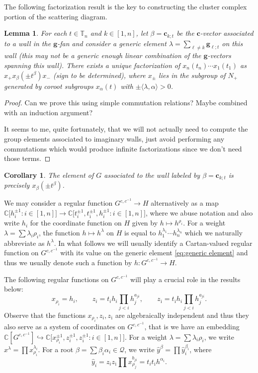 \documentclass{amsart}
\newtheorem{corollary}[theorem]{Corollary}
\newtheorem{lemma}[theorem]{Lemma}
\numberwithin{theorem}{section}
\newcommand{\bfc}{\mathbf{c}}
\newcommand{\bfg}{\mathbf{g}}
\newcommand{\cQ}{\mathcal{Q}}
\newcommand{\CC}{\mathbb{C}}
\newcommand{\TT}{\mathbb{T}}
\newcommand{\into}{\hookrightarrow}
\newcommand{\oi}{{\overline{\imath}}}
\begin{document}
    The following factorization result is the key to constructing the cluster complex portion of the scattering diagram.
    \begin{lemma}
      For each $t\in\TT_n$ and $k\in[1,n]$, let $\beta=\bfc_{k;t}$ be the $\bfc$-vector associated to a wall in the $\bfg$-fan and consider a generic element $\lambda=\sum_{\ell\ne k}\bfg_{\ell;t}$ on this wall (this may not be a generic enough linear combination of the $\bfg$-vectors spanning this wall).
      There exists a unique factorization of $x_n(t_n)\cdots x_1(t_1)$ as $x_+ x_\beta(\pm t^\beta) x_-$ (sign to be determined),
      where $x_\pm$ lies in the subgroup of $N_+$ generated by coroot subgroups $x_\alpha(t)$ with $\pm\langle\lambda,\alpha\rangle>0$.
    \end{lemma}
    \begin{proof}
      Can we prove this using simple commutation relations?
      Maybe combined with an induction argument?

      It seems to me, quite fortunately, that we will not actually need to compute the group elements associated to imaginary walls, just avoid performing any commutations which would produce infinite factorizations since we don't need those terms.
    \end{proof}
    \begin{corollary}
      The element of $G$ associated to the wall labeled by $\beta=\bfc_{k;t}$ is precisely $x_\beta(\pm t^\beta)$.
    \end{corollary}
    
    We may consider a regular function $G^{c,c^{-1}}\to H$ alternatively as a map $\CC\big[h_i^{\pm1}:i\in[1,n]\big]\to \CC\big[t_i^{\pm1},t_\oi^{\pm1},h_i^{\pm1}:i\in[1,n]\big]$, where we abuse notation and also write $h_i$ for the coordinate function on $H$ given by $h\mapsto h^{\rho_i}$.
    For a weight $\lambda=\sum\lambda_i\rho_i$, the function $h\mapsto h^\lambda$ on $H$ is equal to $h_1^{\lambda_1}\cdots h_n^{\lambda_n}$ which we naturally abbreviate as $h^\lambda$.
    In what follows we will usually identify a Cartan-valued regular function on $G^{c,c^{-1}}$ with its value on the generic element \eqref{eq:generic element} and thus we usually denote such a function by $h:G^{c,c^{-1}}\to H$.

    The following regular functions on $G^{c,c^{-1}}$ will play a crucial role in the results below:
    \[x_{\rho_i}=h_i,\qquad z_i=t_i h_i\prod_{j<i} h_j^{a_{ji}},\qquad z_\oi=t_\oi h_i\prod_{j<i} h_j^{a_{ji}}.\]
    Observe that the functions $x_{\rho_i},z_i,z_\oi$ are algebraically independent and thus they also serve as a system of coordinates on $G^{c,c^{-1}}$, that is we have an embedding $\CC[G^{c,c^{-1}}]\into\CC\big[x_{\rho_i}^{\pm1},z_i^{\pm1},z_\oi^{\pm1}:i\in[1,n]\big]$.
    For a weight $\lambda=\sum \lambda_i\rho_i$, we write $x^\lambda=\prod x_{\rho_i}^{\lambda_i}$.
    For a root $\beta=\sum \beta_i\alpha_i\in\cQ$, we write $\hat y^\beta=\prod \hat y_i^{\beta_i}$, where 
    \[\hat y_i=z_i z_\oi \prod x_{\rho_j}^{b_{ji}}=t_i t_\oi h^{\alpha_i}.\]
\end{document}
